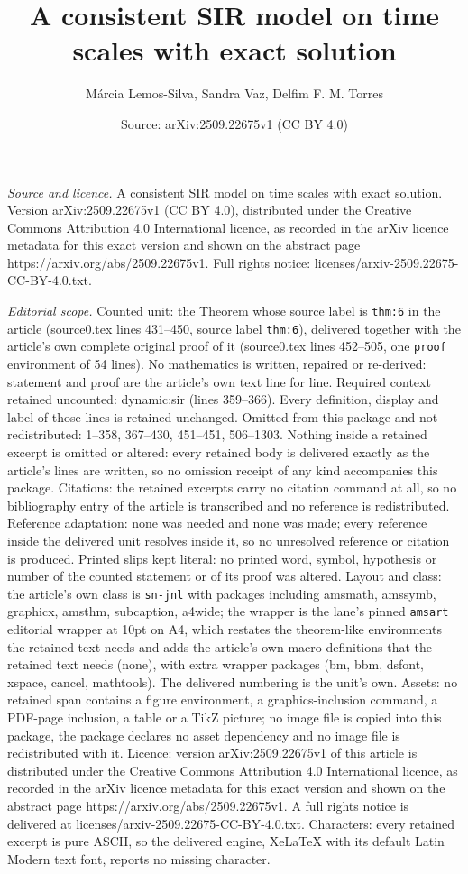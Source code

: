 \documentclass[10pt,a4paper]{amsart}
\title[A consistent SIR model on time scales with exact solution]{A consistent SIR model on time scales with exact solution}
\author{M\'arcia Lemos-Silva, Sandra Vaz, Delfim F. M. Torres}
\date{Source: arXiv:2509.22675v1 (CC BY 4.0)}
\begin{document}
\maketitle

\noindent\emph{Source and licence.} A consistent SIR model on time scales with exact solution. Version arXiv:2509.22675v1 (CC BY 4.0), distributed under the Creative Commons Attribution 4.0 International licence, as recorded in the arXiv licence metadata for this exact version and shown on the abstract page https://arxiv.org/abs/2509.22675v1. Full rights notice: licenses/arxiv-2509.22675-CC-BY-4.0.txt.\par\smallskip

\noindent\textit{Editorial scope.} Counted unit: the Theorem whose source label is \texttt{thm:6} in the article (source0.tex lines 431--450, source label \texttt{thm:6}), delivered together with the article's own complete original proof of it (source0.tex lines 452--505, one \texttt{proof} environment of 54 lines). No mathematics is written, repaired or re-derived: statement and proof are the article's own text line for line. Required context retained uncounted: dynamic:sir (lines 359--366). Every definition, display and label of those lines is retained unchanged. Omitted from this package and not redistributed: 1--358, 367--430, 451--451, 506--1303. Nothing inside a retained excerpt is omitted or altered: every retained body is delivered exactly as the article's lines are written, so no omission receipt of any kind accompanies this package. Citations: the retained excerpts carry no citation command at all, so no bibliography entry of the article is transcribed and no reference is redistributed. Reference adaptation: none was needed and none was made; every reference inside the delivered unit resolves inside it, so no unresolved reference or citation is produced. Printed slips kept literal: no printed word, symbol, hypothesis or number of the counted statement or of its proof was altered. Layout and class: the article's own class is \texttt{sn-jnl} with packages including amsmath, amssymb, graphicx, amsthm, subcaption, a4wide; the wrapper is the lane's pinned \texttt{amsart} editorial wrapper at 10pt on A4, which restates the theorem-like environments the retained text needs and adds the article's own macro definitions that the retained text needs (none), with extra wrapper packages (bm, bbm, dsfont, xspace, cancel, mathtools). The delivered numbering is the unit's own. Assets: no retained span contains a figure environment, a graphics-inclusion command, a PDF-page inclusion, a table or a TikZ picture; no image file is copied into this package, the package declares no asset dependency and no image file is redistributed with it. Licence: version arXiv:2509.22675v1 of this article is distributed under the Creative Commons Attribution 4.0 International licence, as recorded in the arXiv licence metadata for this exact version and shown on the abstract page https://arxiv.org/abs/2509.22675v1. A full rights notice is delivered at licenses/arxiv-2509.22675-CC-BY-4.0.txt. Characters: every retained excerpt is pure ASCII, so the delivered engine, XeLaTeX with its default Latin Modern text font, reports no missing character.
\end{document}
